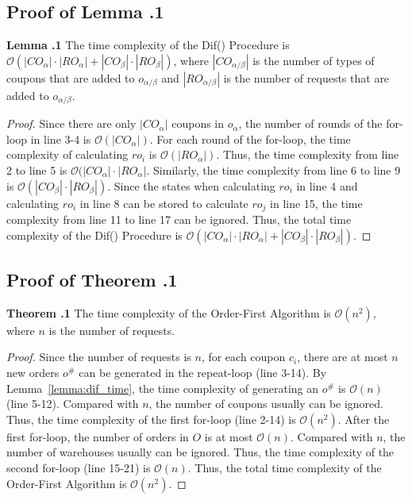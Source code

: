 \subsection{Proof of Lemma \uppercase\expandafter{}.1}

\noindent\textbf{Lemma \uppercase\expandafter{}.1}
The time complexity of the Dif() Procedure is $\mathcal{O}(|CO_\alpha| \cdot |RO_\alpha| + |CO_\beta| \cdot |RO_\beta|)$, where $|CO_{\alpha/\beta}|$ is the number of types of coupons that are added to $o_{\alpha/\beta}$ and $|RO_{\alpha/\beta}|$ is the number of requests that are added to $o_{\alpha/\beta}$.

\begin{proof}
	Since there are only $|CO_{\alpha}|$ coupons in $o_{\alpha}$, the number of rounds of the for-loop in line 3-4 is $\mathcal{O}(|CO_{\alpha}|)$. For each round of the for-loop, the time complexity of calculating $ro_i$ is $\mathcal{O}(|RO_\alpha|)$. Thus, the time complexity from line 2 to line 5 is $\mathcal{O}(|CO_\alpha| \cdot |RO_\alpha|$. Similarly, the time complexity from line 6 to line 9 is $\mathcal{O}(|CO_\beta| \cdot |RO_\beta|)$. Since the states when calculating $ro_i$ in line 4 and calculating $ro_i$ in line 8 can be stored to calculate $ro_j$ in line 15, the time complexity from line 11 to line 17 can be ignored. Thus, the total time complexity of the Dif() Procedure is $\mathcal{O}(|CO_\alpha| \cdot |RO_\alpha| + |CO_\beta| \cdot |RO_\beta|)$.
\end{proof}

\subsection{Proof of Theorem \uppercase\expandafter{}.1}

\noindent\textbf{Theorem \uppercase\expandafter{}.1}
The time complexity of the Order-First Algorithm is $\mathcal{O}(n^2)$, where $n$ is the number of requests.

\begin{proof}
	Since the number of requests is $n$, for each coupon $c_i$, there are at most $n$ new orders $o^\#$ can be generated in the repeat-loop (line 3-14). By Lemma~\ref{lemma:dif_time}, the time complexity of generating an $o^\#$ is $\mathcal{O}(n)$ (line 5-12). Compared with $n$, the number of coupons usually can be ignored. Thus, the time complexity of the first for-loop (line 2-14) is $\mathcal{O}(n^2)$. After the first for-loop, the number of orders in $O$ is at most $\mathcal{O}(n)$. Compared with $n$, the number of warehouses usually can be ignored. Thus, the time complexity of the second for-loop (line 15-21) is $\mathcal{O}(n)$. Thus, the total time complexity of the Order-First Algorithm is $\mathcal{O}(n^2)$.
\end{proof}

